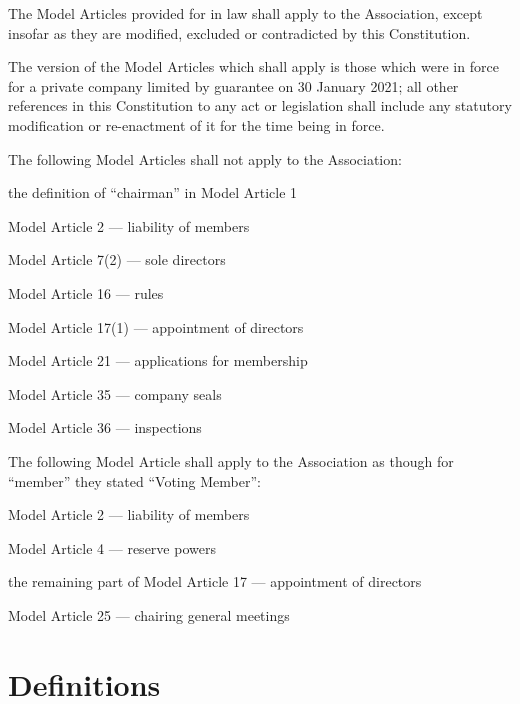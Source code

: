 \documentclass[12pt]{article}
\begin{document}
\begin{constenum}

\item The Model Articles provided for in law shall apply to the
  Association, except insofar as they are modified, excluded or
  contradicted by this Constitution.

\item The version of the Model Articles which shall apply is those
  which were in force for a private company limited by guarantee on
  30 January 2021; all other references in this Constitution
  to any act or legislation shall include any statutory modification
  or re-enactment of it for the time being in force.

\item The following Model Articles shall not apply to the Association:
  \begin{constenum}
  \item the definition of ``chairman'' in Model Article 1
  \item Model Article 2 --- liability of members
  \item Model Article 7(2) --- sole directors
  \item Model Article 16 --- rules
  \item Model Article 17(1) --- appointment of directors
  \item Model Article 21 --- applications for membership
  \item Model Article 35 --- company seals
  \item Model Article 36 --- inspections
  \end{constenum}

\item The following Model Article shall apply to the Association
  as though for ``member'' they stated ``Voting Member'':

  \begin{constenum}
  \item Model Article 2 --- liability of members
  \item Model Article 4 --- reserve powers
  \item the remaining part of Model Article 17 --- appointment of directors
  \item Model Article 25 --- chairing general meetings
  \end{constenum}

\end{constenum}

\section{Definitions}
\end{document}
